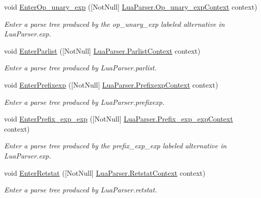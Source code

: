 \begin{DoxyCompactItemize}
void \mbox{\hyperlink{classzlua_1_1_compiler_a6eb871aad9a35e90e75434308d7edac0}{Enter\+Op\+\_\+unary\+\_\+exp}} (\mbox{[}Not\+Null\mbox{]} \mbox{\hyperlink{classzlua_1_1_lua_parser_1_1_op__unary__exp_context}{Lua\+Parser.\+Op\+\_\+unary\+\_\+exp\+Context}} context)
\begin{DoxyCompactList}\small\item\em Enter a parse tree produced by the {\ttfamily op\+\_\+unary\+\_\+exp} labeled alternative in Lua\+Parser.\+exp. \end{DoxyCompactList}\item 
void \mbox{\hyperlink{classzlua_1_1_compiler_a6cca7cfa803b7be16090f38ffd6b7186}{Enter\+Parlist}} (\mbox{[}Not\+Null\mbox{]} \mbox{\hyperlink{classzlua_1_1_lua_parser_1_1_parlist_context}{Lua\+Parser.\+Parlist\+Context}} context)
\begin{DoxyCompactList}\small\item\em Enter a parse tree produced by Lua\+Parser.\+parlist. \end{DoxyCompactList}\item 
void \mbox{\hyperlink{classzlua_1_1_compiler_a275bfb29b3cb0fd2322f2a58d6de2e22}{Enter\+Prefixexp}} (\mbox{[}Not\+Null\mbox{]} \mbox{\hyperlink{classzlua_1_1_lua_parser_1_1_prefixexp_context}{Lua\+Parser.\+Prefixexp\+Context}} context)
\begin{DoxyCompactList}\small\item\em Enter a parse tree produced by Lua\+Parser.\+prefixexp. \end{DoxyCompactList}\item 
void \mbox{\hyperlink{classzlua_1_1_compiler_ad48048f780b0cb63ea44f0e45f26ddea}{Enter\+Prefix\+\_\+exp\+\_\+exp}} (\mbox{[}Not\+Null\mbox{]} \mbox{\hyperlink{classzlua_1_1_lua_parser_1_1_prefix__exp__exp_context}{Lua\+Parser.\+Prefix\+\_\+exp\+\_\+exp\+Context}} context)
\begin{DoxyCompactList}\small\item\em Enter a parse tree produced by the {\ttfamily prefix\+\_\+exp\+\_\+exp} labeled alternative in Lua\+Parser.\+exp. \end{DoxyCompactList}\item 
void \mbox{\hyperlink{classzlua_1_1_compiler_aee24dcb3e97d2fc95ec9c970867c8876}{Enter\+Retstat}} (\mbox{[}Not\+Null\mbox{]} \mbox{\hyperlink{classzlua_1_1_lua_parser_1_1_retstat_context}{Lua\+Parser.\+Retstat\+Context}} context)
\begin{DoxyCompactList}\small\item\em Enter a parse tree produced by Lua\+Parser.\+retstat. \end{DoxyCompactList}\item 

\end{DoxyCompactItemize}

